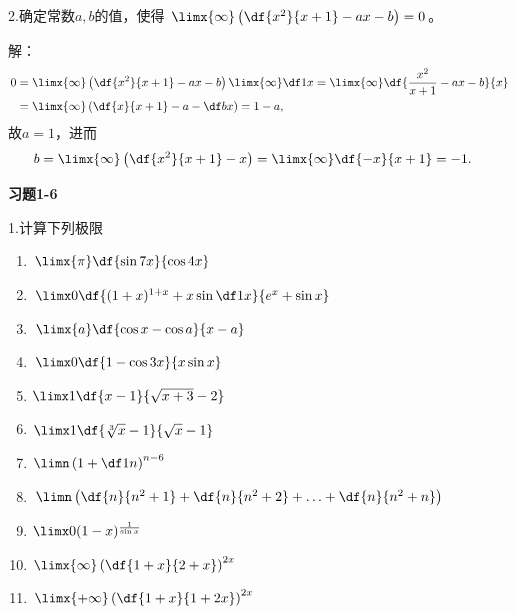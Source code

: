 \bs
2.确定常数$a,b$的值，使得
$\limx{\infty}\left(\df{x^2}{x+1}-ax-b\right)=0$。

解：
\begin{align*}
	0&=\limx{\infty}\left(\df{x^2}{x+1}-ax-b\right)\limx{\infty}\df1x
	=\limx{\infty}\df{\frac{x^2}{x+1}-ax-b}{x}\\
	&=\limx{\infty}\left(\df{x}{x+1}-a-\df bx\right)
	=1-a,
\end{align*}
故$a=1$，进而
\begin{align*}
	b&=\limx{\infty}\left(\df{x^2}{x+1}-x\right)
	=\limx{\infty}\df{-x}{x+1}=-1.
\end{align*}
\fin

\bs
\begin{center}
	\bf 习题1-6
\end{center}

\bigskip
1.计算下列极限
  \begin{enumerate}[(1)]
  	\setlength{\itemindent}{1cm}
    \item $\limx{\pi}\df{\sin 7x}{\cos 4x}$
    \item $\limx0\df{(1+x)^{1+x}+x\sin\df1x}{e^x+\sin x}$
    \item $\limx{a}\df{\cos x-\cos a}{x-a}$
    \item $\limx0\df{1-\cos3x}{x\sin x}$
    \item $\limx1\df{x-1}{\sqrt{x+3}-2}$
    \item $\limx1\df{\sqrt[3]x-1}{\sqrt x-1}$
    \item $\limn\left(1+\df1n\right)^{n-6}$
    \item $\limn\left(\df{n}{n^2+1}+\df{n}{n^2+2}
    +\ldots+\df{n}{n^2+n}\right)$
    \item $\limx0(1-x)^{\frac1{\sin x}}$
    \item $\limx{\infty}\left(\df{1+x}{2+x}\right)^{2x}$
    \item $\limx{+\infty}\left(\df{1+x}{1+2x}\right)^{2x}$
  \end{enumerate}

